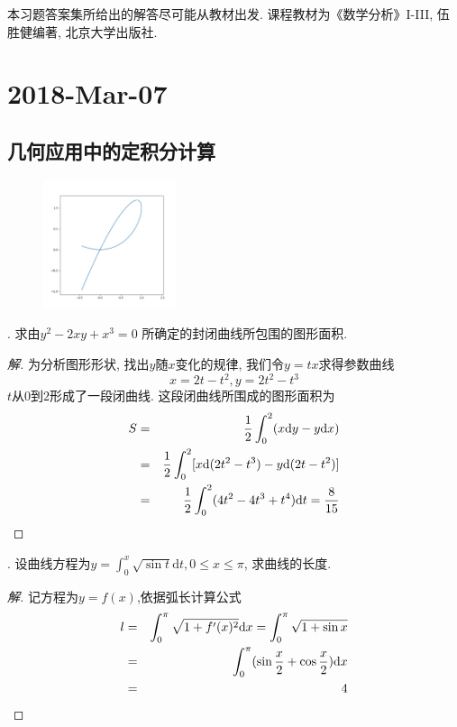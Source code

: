 \documentclass[a4paper,12pt]{article}
\author{龙子超}
\title{{\heiti {\zihao{3} 数学分析II-习题课}}}
\date{}
\begin{document}
\maketitle
%


本习题答案集所给出的解答尽可能从教材出发. 
课程教材为《数学分析》I-III, 伍胜健编著,
北京大学出版社.
\section*{2018-Mar-07}
\subsection*{几何应用中的定积分计算}
  \begin{figure}
    \begin{center}
      \includegraphics[width = 0.35\textwidth]{1.png}
    \end{center}
  \end{figure}
. 求由$y^2-2xy+x^3=0$ 所确定的封闭曲线所包围的图形面积.
\begin{proof}[解]
  \noindent 为分析图形形状, 找出$y$随$x$变化的规律, 我们令$y=tx$求得参数曲线
  \[x=2t-t^2,y=2t^2-t^3\]
  $t$从$0$到$2$形成了一段闭曲线. 这段闭曲线所围成的图形面积为
  \begin{eqnarray*}
    S&=&\frac{1}{2}\int_0^2(x\mathrm{d} y-y\mathrm{d} x)\\
    &=&\frac{1}{2}\int_0^2[x\mathrm{d} (2t^2-t^3)-y\mathrm{d} (2t-t^2)]\\
    &=&\frac{1}{2}\int_0^2(4t^2-4t^3+t^4)\mathrm{d} t=\frac{8}{15}
  \end{eqnarray*}
\end{proof}

. 设曲线方程为$y=\int_0^x\sqrt{\sin t}\mathrm{d}t, 0\leq x\leq\pi$, 求曲线的长度.
\begin{proof}[解]
  记方程为$y=f(x)$,依据弧长计算公式
  \begin{eqnarray*}
    l&=&\int_0^\pi\sqrt{1+f'(x)^2}\mathrm{d} x=\int_0^\pi\sqrt{1+\sin x}\\
    &=&\int_0^\pi(\sin\frac{x}{2}+\cos\frac{x}{2})\mathrm{d} x\\
    &=&4
  \end{eqnarray*}
\end{proof}
\end{document}
